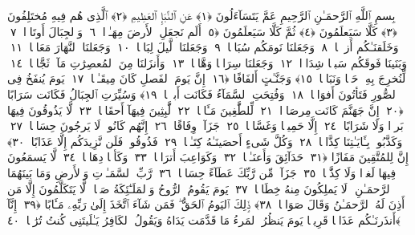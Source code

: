 
  
    
  
    
    

\nopagebreak
  بِسمِ ٱللَّهِ ٱلرَّحمَـٰنِ ٱلرَّحِيمِ
  عَمَّ يَتَسَآءَلُونَ ﴿١﴾
 عَنِ ٱلنَّبَإِ ٱلعَظِيمِ ﴿٢﴾
 ٱلَّذِى هُم فِيهِ مُختَلِفُونَ ﴿٣﴾
 كَلَّا سَيَعلَمُونَ ﴿٤﴾
 ثُمَّ كَلَّا سَيَعلَمُونَ ﴿٥﴾
 أَلَم نَجعَلِ ٱلأَرضَ مِهَـٰدًۭا ﴿٦﴾
 وَٱلجِبَالَ أَوتَادًۭا ﴿٧﴾
 وَخَلَقنَـٰكُم أَزوَٟجًۭا ﴿٨﴾
 وَجَعَلنَا نَومَكُم سُبَاتًۭا ﴿٩﴾
 وَجَعَلنَا ٱلَّيلَ لِبَاسًۭا ﴿١٠﴾
 وَجَعَلنَا ٱلنَّهَارَ مَعَاشًۭا ﴿١١﴾
 وَبَنَينَا فَوقَكُم سَبعًۭا شِدَادًۭا ﴿١٢﴾
 وَجَعَلنَا سِرَاجًۭا وَهَّاجًۭا ﴿١٣﴾
 وَأَنزَلنَا مِنَ ٱلمُعصِرَٰتِ مَآءًۭ ثَجَّاجًۭا ﴿١٤﴾
 لِّنُخرِجَ بِهِۦ حَبًّۭا وَنَبَاتًۭا ﴿١٥﴾
 وَجَنَّـٰتٍ أَلفَافًا ﴿١٦﴾
 إِنَّ يَومَ ٱلفَصلِ كَانَ مِيقَـٰتًۭا ﴿١٧﴾
 يَومَ يُنفَخُ فِى ٱلصُّورِ فَتَأتُونَ أَفوَاجًۭا ﴿١٨﴾
 وَفُتِحَتِ ٱلسَّمَآءُ فَكَانَت أَبوَٟبًۭا ﴿١٩﴾
 وَسُيِّرَتِ ٱلجِبَالُ فَكَانَت سَرَابًا ﴿٢٠﴾
 إِنَّ جَهَنَّمَ كَانَت مِرصَادًۭا ﴿٢١﴾
 لِّلطَّٰغِينَ مَـَٔابًۭا ﴿٢٢﴾
 لَّٰبِثِينَ فِيهَآ أَحقَابًۭا ﴿٢٣﴾
 لَّا يَذُوقُونَ فِيهَا بَردًۭا وَلَا شَرَابًا ﴿٢٤﴾
 إِلَّا حَمِيمًۭا وَغَسَّاقًۭا ﴿٢٥﴾
 جَزَآءًۭ وِفَاقًا ﴿٢٦﴾
 إِنَّهُم كَانُوا۟ لَا يَرجُونَ حِسَابًۭا ﴿٢٧﴾
 وَكَذَّبُوا۟ بِـَٔايَـٰتِنَا كِذَّابًۭا ﴿٢٨﴾
 وَكُلَّ شَىءٍ أَحصَينَـٰهُ كِتَـٰبًۭا ﴿٢٩﴾
 فَذُوقُوا۟ فَلَن نَّزِيدَكُم إِلَّا عَذَابًا ﴿٣٠﴾
 إِنَّ لِلمُتَّقِينَ مَفَازًا ﴿٣١﴾
 حَدَآئِقَ وَأَعنَـٰبًۭا ﴿٣٢﴾
 وَكَوَاعِبَ أَترَابًۭا ﴿٣٣﴾
 وَكَأسًۭا دِهَاقًۭا ﴿٣٤﴾
 لَّا يَسمَعُونَ فِيهَا لَغوًۭا وَلَا كِذَّٰبًۭا ﴿٣٥﴾
 جَزَآءًۭ مِّن رَّبِّكَ عَطَآءً حِسَابًۭا ﴿٣٦﴾
 رَّبِّ ٱلسَّمَـٰوَٟتِ وَٱلأَرضِ وَمَا بَينَهُمَا ٱلرَّحمَـٰنِ ۖ لَا يَملِكُونَ مِنهُ خِطَابًۭا ﴿٣٧﴾
 يَومَ يَقُومُ ٱلرُّوحُ وَٱلمَلَـٰٓئِكَةُ صَفًّۭا ۖ لَّا يَتَكَلَّمُونَ إِلَّا مَن أَذِنَ لَهُ ٱلرَّحمَـٰنُ وَقَالَ صَوَابًۭا ﴿٣٨﴾
 ذَٟلِكَ ٱليَومُ ٱلحَقُّ ۖ فَمَن شَآءَ ٱتَّخَذَ إِلَىٰ رَبِّهِۦ مَـَٔابًا ﴿٣٩﴾
 إِنَّآ أَنذَرنَـٰكُم عَذَابًۭا قَرِيبًۭا يَومَ يَنظُرُ ٱلمَرءُ مَا قَدَّمَت يَدَاهُ وَيَقُولُ ٱلكَافِرُ يَـٰلَيتَنِى كُنتُ تُرَٰبًۢا ﴿٤٠﴾
 
